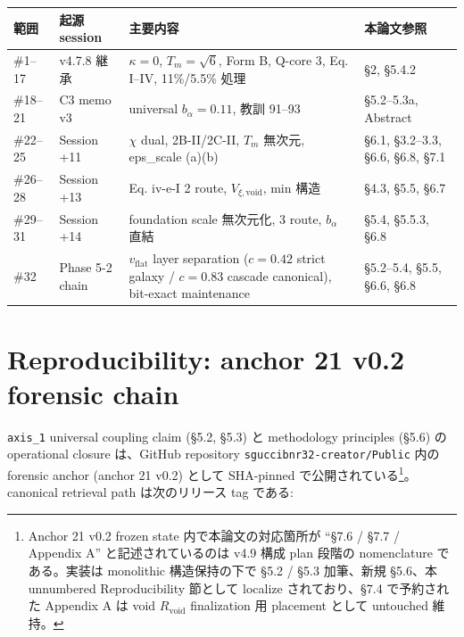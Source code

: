 \documentclass[11pt,a4paper]{ltjsarticle}
\newcommand{\Vxivoid}{V_{\xi,\mathrm{void}}}
\newcommand{\Tm}{T_{m}}
\newcommand{\bal}{b_{\alpha}}
\newcommand{\Rvoid}{R_{\mathrm{void}}}
\begin{document}
\begin{center}\small
\begin{tabularx}{\linewidth}{@{}l l >{\raggedright\arraybackslash}X >{\raggedright\arraybackslash}X@{}}
\toprule
範囲 & 起源 session & 主要内容 & 本論文参照 \\
\midrule
\#1--17 & v4.7.8 継承 & $\kappa = 0$, $\Tm = \sqrt{6}$, Form B, Q-core 3, Eq. I--IV, 11\%/5.5\% 処理 & \S 2, \S 5.4.2 \\
\#18--21 & C3 memo v3 & universal $\bal = 0.11$, 教訓 91--93 & \S 5.2--5.3a, Abstract \\
\#22--25 & Session +11 & $\chi$ dual, 2B-II/2C-II, $\Tm$ 無次元, eps\_scale (a)(b) & \S 6.1, \S 3.2--3.3, \S 6.6, \S 6.8, \S 7.1 \\
\#26--28 & Session +13 & Eq. iv-e-I 2 route, $\Vxivoid$, min 構造 & \S 4.3, \S 5.5, \S 6.7 \\
\#29--31 & Session +14 & foundation scale 無次元化, 3 route, $\bal$ 直結 & \S 5.4, \S 5.5.3, \S 6.8 \\
\#32 & Phase 5-2 chain & $v_{\mathrm{flat}}$ layer separation ($c = 0.42$ strict galaxy / $c = 0.83$ cascade canonical), bit-exact maintenance & \S 5.2--5.4, \S 5.5, \S 6.6, \S 6.8 \\
\bottomrule
\end{tabularx}
\end{center}


\section*{Reproducibility: anchor 21 v0.2 forensic chain}
\label{sec:reproducibility-axis1-v02}

\texttt{axis\_1} universal coupling claim (\S 5.2, \S 5.3) と methodology principles
(\S 5.6) の operational closure は、GitHub repository
\texttt{sguccibnr32-creator/Public} 内の forensic anchor (anchor 21 v0.2) として
SHA-pinned で公開されている\footnote{Anchor 21 v0.2 frozen state 内で本論文の対応箇所が
``\S 7.6 / \S 7.7 / Appendix A'' と記述されているのは v4.9 構成 plan 段階の nomenclature
である。実装は monolithic 構造保持の下で \S 5.2 / \S 5.3 加筆、新規 \S 5.6、本 unnumbered
Reproducibility 節として localize されており、\S 7.4 で予約された Appendix A は
void $\Rvoid$ finalization 用 placement として untouched 維持。}。canonical retrieval
path は次のリリース tag である:
\end{document}
